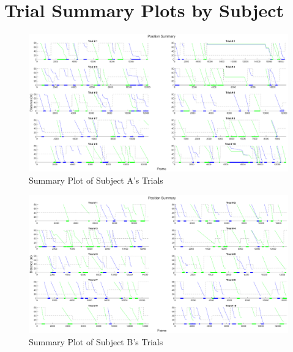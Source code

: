 \begin{appendices}
\chapter{}
\label{appendix:text}


\chapter{Trial Summary Plots by Subject}
\label{appendix:SubjectSummary}
\newcommand\plotHeight{0.8}
\begin{figure}[hbt!]
    \centering
    \includegraphics[width=\linewidth, height=\plotHeight\linewidth]{figures/subject_a_summary.eps}
    \caption{Summary Plot of Subject A's Trials}
    \label{fig:SumA}
\end{figure}

\begin{figure}[hbt!]
    \centering
    \includegraphics[width=\linewidth, height=\plotHeight\linewidth]{figures/subject_b_summary.eps}
    \caption{Summary Plot of Subject B's Trials}
    \label{fig:SumB}
\end{figure}


\end{appendices}
